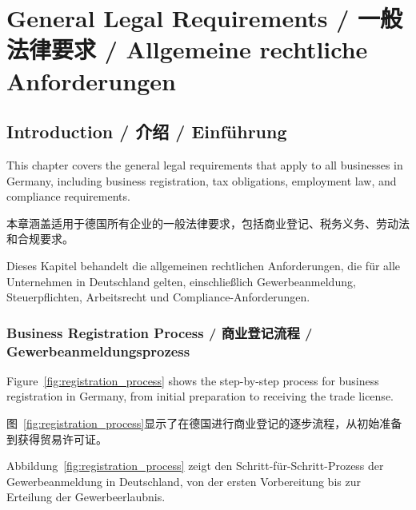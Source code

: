 \chapter{General Legal Requirements / 一般法律要求 / Allgemeine rechtliche Anforderungen}

\section{Introduction / 介绍 / Einführung}

This chapter covers the general legal requirements that apply to all businesses in Germany, including business registration, tax obligations, employment law, and compliance requirements.

本章涵盖适用于德国所有企业的一般法律要求，包括商业登记、税务义务、劳动法和合规要求。

Dieses Kapitel behandelt die allgemeinen rechtlichen Anforderungen, die für alle Unternehmen in Deutschland gelten, einschließlich Gewerbeanmeldung, Steuerpflichten, Arbeitsrecht und Compliance-Anforderungen.

\subsection{Business Registration Process / 商业登记流程 / Gewerbeanmeldungsprozess}

Figure~\ref{fig:registration_process} shows the step-by-step process for business registration in Germany, from initial preparation to receiving the trade license.

图~\ref{fig:registration_process}显示了在德国进行商业登记的逐步流程，从初始准备到获得贸易许可证。

Abbildung~\ref{fig:registration_process} zeigt den Schritt-für-Schritt-Prozess der Gewerbeanmeldung in Deutschland, von der ersten Vorbereitung bis zur Erteilung der Gewerbeerlaubnis.

